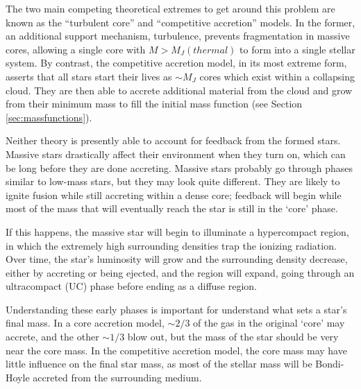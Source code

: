 The two main competing theoretical extremes to get around this problem are
known as the ``turbulent core'' and ``competitive accretion'' models.  In the
former, an additional support mechanism, turbulence, prevents fragmentation in
massive cores, allowing a single core with $M>M_J(thermal)$ to form into a
single stellar system.  By contrast, the competitive accretion model, in its
most extreme form, asserts that all stars start their lives as $\sim M_J$ cores
which exist within a collapsing cloud.  They are then able to accrete
additional material from the cloud and grow from their minimum mass to fill the
initial mass function (see Section \ref{sec:massfunctions}).

Neither theory is presently able to account for feedback from the formed stars.
Massive stars drastically affect their environment when they turn on, which can
be long before they are done accreting.  Massive stars probably go through
phases similar to low-mass stars, but they may look quite different.  They are
likely to ignite fusion while still accreting within a dense core; feedback
will begin while most of the mass that will eventually reach the star is still
in the `core' phase.

If this happens, the massive star will begin to
illuminate a hypercompact \hii region, in which the extremely high surrounding
densities trap the ionizing radiation.  Over time, the star's luminosity will
grow and the surrounding density decrease, either by accreting or being
ejected, and the \hii region will expand, going through an ultracompact (UC)
\hii phase before ending as a diffuse \hii region.

Understanding these early phases is important for understand what sets a star's
final mass.  In a core accretion model, $\sim2/3$ of the gas in the original
`core' may accrete, and the other $\sim1/3$ blow out, but the mass of the star
should be very near the core mass.  In the competitive accretion model, the core
mass may have little influence on the final star mass, as most of the stellar mass
will be Bondi-Hoyle accreted from the surrounding medium.


